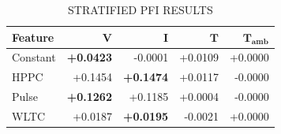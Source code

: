 \begin{table}[H]
	\caption{STRATIFIED PFI RESULTS}
	\label{tab:pfi_results}
	\begin{center}
		\footnotesize
		\begin{tabular}{lrrrr}
			\hline
			\textbf{Feature} & $\mathbf{V}$     & $\mathbf{I}$     & $\mathbf{T}$ & $\mathbf{T_{amb}}$ \\
			\hline
			Constant         & \textbf{+0.0423} & -0.0001          & +0.0109      & +0.0000            \\
			HPPC             & +0.1454          & \textbf{+0.1474} & +0.0117      & -0.0000            \\
			Pulse            & \textbf{+0.1262} & +0.1185          & +0.0004      & -0.0000            \\
			WLTC             & +0.0187          & \textbf{+0.0195} & -0.0021      & +0.0000            \\
			\hline
		\end{tabular}
	\end{center}
\end{table}
